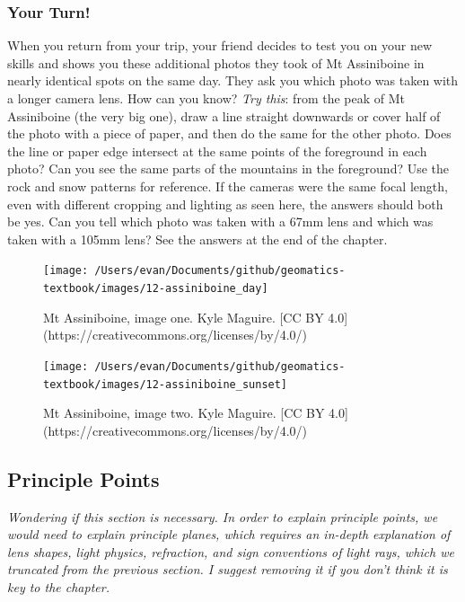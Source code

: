 \documentclass[
]{book}
\begin{document}
\hypertarget{your-turn-7}{%
\subsubsection*{Your Turn!}\label{your-turn-7}}

When you return from your trip, your friend decides to test you on your new skills and shows you these additional photos they took of Mt Assiniboine in nearly identical spots on the same day. They ask you which photo was taken with a longer camera lens. How can you know?
\emph{Try this}: from the peak of Mt Assiniboine (the very big one), draw a line straight downwards or cover half of the photo with a piece of paper, and then do the same for the other photo. Does the line or paper edge intersect at the same points of the foreground in each photo? Can you see the same parts of the mountains in the foreground? Use the rock and snow patterns for reference. If the cameras were the same focal length, even with different cropping and lighting as seen here, the answers should both be yes. Can you tell which photo was taken with a 67mm lens and which was taken with a 105mm lens? See the answers at the end of the chapter.

\begin{figure}
\texttt{[image: /Users/evan/Documents/github/geomatics-textbook/images/12-assiniboine\_day]} \caption{Mt Assiniboine, image one. Kyle Maguire. [CC BY 4.0](https://creativecommons.org/licenses/by/4.0/)}\label{fig:12-assiniboine-day}
\end{figure}

\begin{figure}
\texttt{[image: /Users/evan/Documents/github/geomatics-textbook/images/12-assiniboine\_sunset]} \caption{Mt Assiniboine, image two. Kyle Maguire. [CC BY 4.0](https://creativecommons.org/licenses/by/4.0/)}\label{fig:12-assiniboine-sunset}
\end{figure}

\hypertarget{principle-points}{%
\subsection{Principle Points}\label{principle-points}}

\emph{Wondering if this section is necessary. In order to explain principle points, we would need to explain principle planes, which requires an in-depth explanation of lens shapes, light physics, refraction, and sign conventions of light rays, which we truncated from the previous section. I suggest removing it if you don't think it is key to the chapter.}
\end{document}
